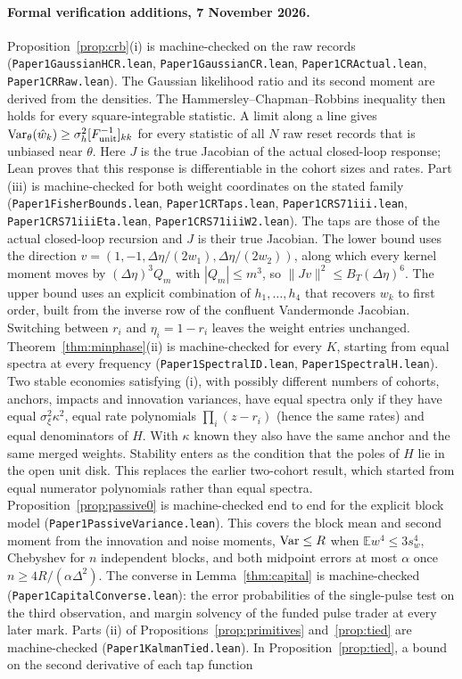 \documentclass[12pt]{article}
\theoremstyle{definition}
\theoremstyle{remark}
\newcommand{\E}{\mathbb{E}}
\begin{document}
\paragraph{Formal verification additions, 7 November 2026.} Proposition~\ref{prop:crb}(i) is machine-checked on the raw records (\nolinkurl{Paper1GaussianHCR.lean}, \nolinkurl{Paper1GaussianCR.lean}, \nolinkurl{Paper1CRActual.lean}, \nolinkurl{Paper1CRRaw.lean}). The Gaussian likelihood ratio and its second moment are derived from the densities. The Hammersley--Chapman--Robbins inequality then holds for every square-integrable statistic. A limit along a line gives ${\rm Var}_\theta(\hat w_k)\ge\sigma_h^2[F_{\rm unit}^{-1}]_{kk}$ for every statistic of all $N$ raw reset records that is unbiased near $\theta$. Here $J$ is the true Jacobian of the actual closed-loop response; Lean proves that this response is differentiable in the cohort sizes and rates. Part (iii) is machine-checked for both weight coordinates on the stated family (\nolinkurl{Paper1FisherBounds.lean}, \nolinkurl{Paper1CRTaps.lean}, \nolinkurl{Paper1CRS71iii.lean}, \nolinkurl{Paper1CRS71iiiEta.lean}, \nolinkurl{Paper1CRS71iiiW2.lean}). The taps are those of the actual closed-loop recursion and $J$ is their true Jacobian. The lower bound uses the direction $v=(1,-1,\Delta\eta/(2w_1),\Delta\eta/(2w_2))$, along which every kernel moment moves by $(\Delta\eta)^3Q_m$ with $|Q_m|\le m^3$, so $\|Jv\|^2\le B_T(\Delta\eta)^6$. The upper bound uses an explicit combination of $h_1,\ldots,h_4$ that recovers $w_k$ to first order, built from the inverse row of the confluent Vandermonde Jacobian. Switching between $r_i$ and $\eta_i=1-r_i$ leaves the weight entries unchanged. Theorem~\ref{thm:minphase}(ii) is machine-checked for every $K$, starting from equal spectra at every frequency (\nolinkurl{Paper1SpectralID.lean}, \nolinkurl{Paper1SpectralH.lean}). Two stable economies satisfying (i), with possibly different numbers of cohorts, anchors, impacts and innovation variances, have equal spectra only if they have equal $\sigma_\xi^2\kappa^2$, equal rate polynomials $\prod_i(z-r_i)$ (hence the same rates) and equal denominators of $H$. With $\kappa$ known they also have the same anchor and the same merged weights. Stability enters as the condition that the poles of $H$ lie in the open unit disk. This replaces the earlier two-cohort result, which started from equal numerator polynomials rather than equal spectra. Proposition~\ref{prop:passive0} is machine-checked end to end for the explicit block model (\nolinkurl{Paper1PassiveVariance.lean}). This covers the block mean and second moment from the innovation and noise moments, ${\rm Var}\le R$ when $\E w^4\le3s_w^4$, Chebyshev for $n$ independent blocks, and both midpoint errors at most $\alpha$ once $n\ge4R/(\alpha\Delta^2)$. The converse in Lemma~\ref{thm:capital} is machine-checked (\nolinkurl{Paper1CapitalConverse.lean}): the error probabilities of the single-pulse test on the third observation, and margin solvency of the funded pulse trader at every later mark. Parts (ii) of Propositions~\ref{prop:primitives} and~\ref{prop:tied} are machine-checked (\nolinkurl{Paper1KalmanTied.lean}). In Proposition~\ref{prop:tied}, a bound on the second derivative of each tap function 
\end{document}
